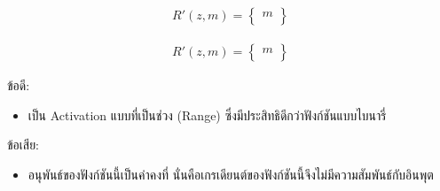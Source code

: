 \begin{itemize}
\begin{figure}[H]
\begin{subfigure}{0.5\textwidth}
            \caption{%
                \begin{equation}
                    \begin{split}R'(z,m) = \begin{Bmatrix} m \\
                    \end{Bmatrix}\end{split}
                \end{equation}
            }
            \label{fig:actfunc_lin_der}
        \end{subfigure}
    \end{figure}
    ข้อดี:
    \begin{itemize}
        \item เป็น Activation แบบที่เป็นช่วง (Range) ซึ่งมีประสิทธิดีกว่าฟังก์ชันแบบไบนารี่
    \end{itemize}
    ข้อเสีย:
    \begin{itemize}
        \item อนุพันธ์ของฟังก์ชันนี้เป็นค่าคงที่ นั่นคือเกรเดียนต์ของฟังก์ชันนี้จึงไม่มีความสัมพันธ์กับอินพุต
    \end{itemize}


\end{itemize}
